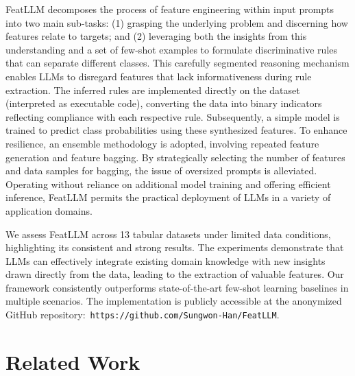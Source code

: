 \textsf{FeatLLM} decomposes the process of feature engineering within input prompts into two main sub-tasks: (1) grasping the underlying problem and discerning how features relate to targets; and (2) leveraging both the insights from this understanding and a set of few-shot examples to formulate discriminative rules that can separate different classes. This carefully segmented reasoning mechanism enables LLMs to disregard features that lack informativeness during rule extraction. The inferred rules are implemented directly on the dataset (interpreted as executable code), converting the data into binary indicators reflecting compliance with each respective rule. Subsequently, a simple model is trained to predict class probabilities using these synthesized features. To enhance resilience, an ensemble methodology is adopted, involving repeated feature generation and feature bagging. By strategically selecting the number of features and data samples for bagging, the issue of oversized prompts is alleviated. Operating without reliance on additional model training and offering efficient inference, \textsf{FeatLLM} permits the practical deployment of LLMs in a variety of application domains.

We assess \textsf{FeatLLM} across 13 tabular datasets under limited data conditions, highlighting its consistent and strong results. The experiments demonstrate that LLMs can effectively integrate existing domain knowledge with new insights drawn directly from the data, leading to the extraction of valuable features. Our framework consistently outperforms state-of-the-art few-shot learning baselines in multiple scenarios. The implementation is publicly accessible at the anonymized GitHub repository:~\texttt{https://github.com/Sungwon-Han/FeatLLM}.

\section{Related Work}

